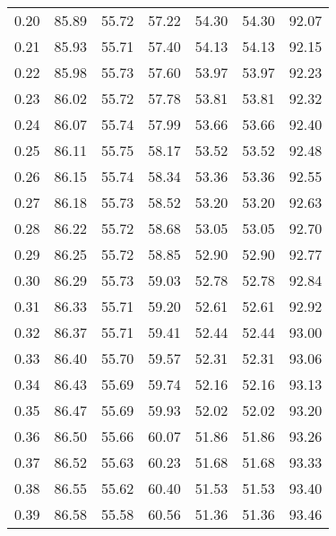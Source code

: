 \begin{tabular}{|c|c|c|c|c|c|c|}
      0.20 &     85.89 &     55.72 &      57.22 &   54.30 &      54.30 &         92.07 \\
      0.21 &     85.93 &     55.71 &      57.40 &   54.13 &      54.13 &         92.15 \\
      0.22 &     85.98 &     55.73 &      57.60 &   53.97 &      53.97 &         92.23 \\
      0.23 &     86.02 &     55.72 &      57.78 &   53.81 &      53.81 &         92.32 \\
      0.24 &     86.07 &     55.74 &      57.99 &   53.66 &      53.66 &         92.40 \\
      0.25 &     86.11 &     55.75 &      58.17 &   53.52 &      53.52 &         92.48 \\
      0.26 &     86.15 &     55.74 &      58.34 &   53.36 &      53.36 &         92.55 \\
      0.27 &     86.18 &     55.73 &      58.52 &   53.20 &      53.20 &         92.63 \\
      0.28 &     86.22 &     55.72 &      58.68 &   53.05 &      53.05 &         92.70 \\
      0.29 &     86.25 &     55.72 &      58.85 &   52.90 &      52.90 &         92.77 \\
      0.30 &     86.29 &     55.73 &      59.03 &   52.78 &      52.78 &         92.84 \\
      0.31 &     86.33 &     55.71 &      59.20 &   52.61 &      52.61 &         92.92 \\
      0.32 &     86.37 &     55.71 &      59.41 &   52.44 &      52.44 &         93.00 \\
      0.33 &     86.40 &     55.70 &      59.57 &   52.31 &      52.31 &         93.06 \\
      0.34 &     86.43 &     55.69 &      59.74 &   52.16 &      52.16 &         93.13 \\
      0.35 &     86.47 &     55.69 &      59.93 &   52.02 &      52.02 &         93.20 \\
      0.36 &     86.50 &     55.66 &      60.07 &   51.86 &      51.86 &         93.26 \\
      0.37 &     86.52 &     55.63 &      60.23 &   51.68 &      51.68 &         93.33 \\
      0.38 &     86.55 &     55.62 &      60.40 &   51.53 &      51.53 &         93.40 \\
      0.39 &     86.58 &     55.58 &      60.56 &   51.36 &      51.36 &         93.46 \\

\end{tabular}
